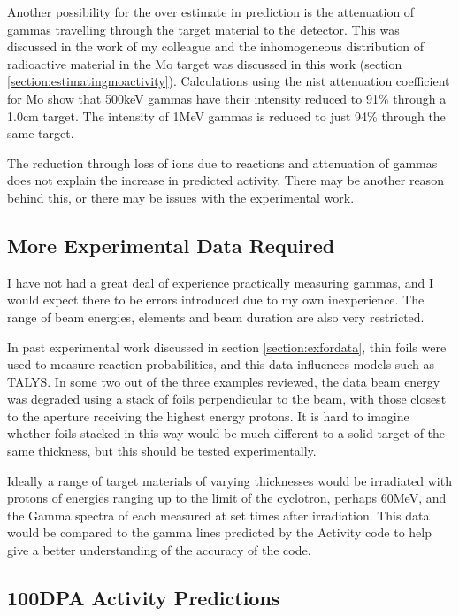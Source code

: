 Another possibility for the over estimate in prediction is the attenuation of gammas travelling through the target material to the detector.  This was discussed in the work of my colleague\cite{johnhewett} and the inhomogeneous distribution of radioactive material in the Mo target was discussed in this work (section \ref{section:estimatingmoactivity}).  Calculations using the \acrshort{nist} attenuation coefficient for Mo show that 500keV gammas have their intensity reduced to 91\% through a 1.0cm target.  The intensity of 1MeV gammas is reduced to just 94\% through the same target.

The reduction through loss of ions due to reactions and attenuation of gammas does not explain the increase in predicted activity.  There may be another reason behind this, or there may be issues with the experimental work.


\subsection{More Experimental Data Required}

I have not had a great deal of experience practically measuring gammas, and I would expect there to be errors introduced due to my own inexperience.  The range of beam energies, elements and beam duration are also very restricted.

In past experimental work discussed in section \ref{section:exfordata}, thin foils were used to measure reaction probabilities, and this data influences models such as TALYS.  In some two out of the three examples reviewed, the data beam energy was degraded using a stack of foils perpendicular to the beam, with those closest to the aperture receiving the highest energy protons.  It is hard to imagine whether foils stacked in this way would be much different to a solid target of the same thickness, but this should be tested experimentally.

Ideally a range of target materials of varying thicknesses would be irradiated with protons of energies ranging up to the limit of the cyclotron, perhaps 60MeV, and the Gamma spectra of each measured at set times after irradiation.  This data would be compared to the gamma lines predicted by the Activity code to help give a better understanding of the accuracy of the code.



\subsection{100DPA Activity Predictions}

